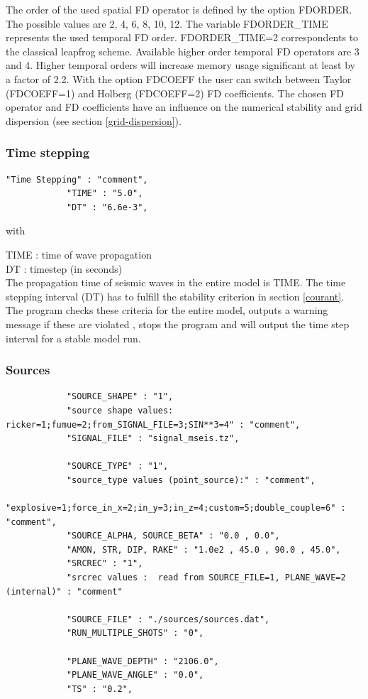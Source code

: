 \documentclass[11pt,onecolumn,oneside]{article}
\begin{document}
The order of the used spatial FD operator is defined by the option FDORDER. The possible values are 2, 4, 6, 8, 10, 12. 
The variable FDORDER\_TIME represents the used temporal FD order. FDORDER\_TIME=2 correspondents to the classical leapfrog scheme. Available higher order temporal FD operators are 3 and 4. Higher temporal orders will increase memory usage significant at least by a factor of 2.2. With the option FDCOEFF the user can switch between Taylor (FDCOEFF=1) and Holberg (FDCOEFF=2) FD coefficients. The chosen FD operator and FD coefficients have an influence on the numerical stability and grid dispersion (see section \ref{grid-dispersion}).


\subsubsection{Time stepping}
\begin{verbatim}
"Time Stepping" : "comment",
			"TIME" : "5.0",
			"DT" : "6.6e-3",
\end{verbatim}

with

TIME : time of wave propagation\\
DT : timestep (in seconds)\\


The propagation time of seismic waves in the entire model is TIME. The time stepping interval (DT) has to fulfill the stability criterion  in section \ref{courant}. 
The program checks these criteria for the entire model, outputs a warning message if these are violated , stops the program and will output the time step interval for a stable model run. 


\subsubsection{Sources}
\label{Sources}
\begin{verbatim}
			"SOURCE_SHAPE" : "1",
			"source shape values: ricker=1;fumue=2;from_SIGNAL_FILE=3;SIN**3=4" : "comment",
			"SIGNAL_FILE" : "signal_mseis.tz",

			"SOURCE_TYPE" : "1",
			"source_type values (point_source):" : "comment",
			"explosive=1;force_in_x=2;in_y=3;in_z=4;custom=5;double_couple=6" : "comment",
			"SOURCE_ALPHA, SOURCE_BETA" : "0.0 , 0.0",
			"AMON, STR, DIP, RAKE" : "1.0e2 , 45.0 , 90.0 , 45.0",
			"SRCREC" : "1",
			"srcrec values :  read from SOURCE_FILE=1, PLANE_WAVE=2 (internal)" : "comment"
			
			"SOURCE_FILE" : "./sources/sources.dat", 
			"RUN_MULTIPLE_SHOTS" : "0", 
			
			"PLANE_WAVE_DEPTH" : "2106.0",
			"PLANE_WAVE_ANGLE" : "0.0",
			"TS" : "0.2",
\end{verbatim}
\end{document}
